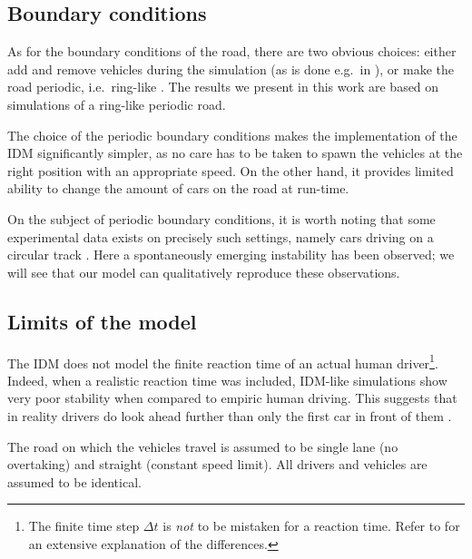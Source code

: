 \subsection{Boundary conditions}
As for the boundary conditions of the road, there are two obvious choices: either add and remove vehicles during the simulation (as is done e.g.\ in \cite{treiber1999}), or make the road periodic, i.e.\ ring-like \cite{treiber2015}. The results we present in this work are based on simulations of a ring-like periodic road.

The choice of the periodic boundary conditions makes the implementation of the IDM significantly simpler, as no care has to be taken to spawn the vehicles at the right position with an appropriate speed. On the other hand, it provides limited ability to change the amount of cars on the road at run-time.

On the subject of periodic boundary conditions, it is worth noting that some experimental data exists on precisely such settings, namely cars driving on a circular track \cite{nakayama2009,tadaki2013}. Here a spontaneously emerging instability has been observed; we will see that our model can qualitatively reproduce these observations.


\subsection{Limits of the model}
The IDM does not model the finite reaction time of an actual human driver\footnote{The finite time step $\Delta t$ is \emph{not} to be mistaken for a reaction time. Refer to \cite{treiber2006} for an extensive explanation of the differences.}. Indeed, when a realistic reaction time was included, IDM-like simulations show very poor stability when compared to empiric human driving. This suggests that in reality drivers do look ahead further than only the first car in front of them \cite{treiber2006}.

The road on which the vehicles travel is assumed to be single lane (no overtaking) and straight (constant speed limit). All drivers and vehicles are assumed to be identical.

